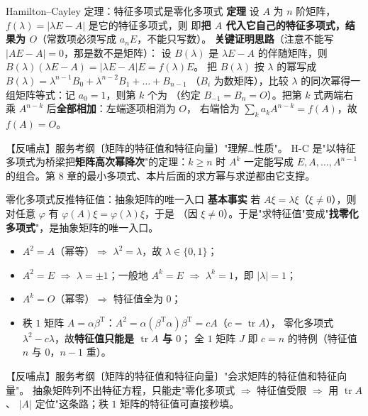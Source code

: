 \begin{fdeep}{Hamilton--Cayley 定理：特征多项式是零化多项式}
\textbf{定理} 设 $A$ 为 $n$ 阶矩阵，$f(\lambda)=\lvert\lambda E-A\rvert$ 是它的特征多项式，则
即\textbf{把 $A$ 代入它自己的特征多项式，结果为 $O$}（常数项必须写成 $a_nE$，不能只写数）。
\textbf{关键证明思路}（注意不能写 $\lvert AE-A\rvert=0$，那是数不是矩阵）：
设 $B(\lambda)$ 是 $\lambda E-A$ 的伴随矩阵，则 $B(\lambda)(\lambda E-A)=\lvert\lambda E-A\rvert E=f(\lambda)E$。
把 $B(\lambda)$ 按 $\lambda$ 的幂写成 $B(\lambda)=\lambda^{n-1}B_0+\lambda^{n-2}B_1+\dots+B_{n-1}$
（$B_i$ 为数矩阵），比较 $\lambda$ 的同次幂得一组矩阵等式：记 $a_0=1$，则第 $k$ 个为
（约定 $B_{-1}=B_n=O$）。把第 $k$ 式两端右乘 $A^{n-k}$ 后\textbf{全部相加}：左端逐项相消为 $O$，
右端恰为 $\sum_ka_kA^{n-k}=f(A)$，故 $f(A)=O$。

【反哺点】服务考纲〔矩阵的特征值和特征向量〕"理解…性质"。
H-C 是"以特征多项式为桥梁把\textbf{矩阵高次幂降次}"的定理：$k\ge n$ 时 $A^{k}$ 一定能写成
$E,A,\dots,A^{n-1}$ 的组合。第 8 章的最小多项式、本片后面的求方幂与求逆都由它支撑。
\end{fdeep}

\begin{fdeep}{零化多项式反推特征值：抽象矩阵的唯一入口}
\textbf{基本事实} 若 $A\xi=\lambda\xi$（$\xi\ne0$），则对任意 $\varphi$ 有
$\varphi(A)\xi=\varphi(\lambda)\xi$，于是
（因 $\xi\ne0$）。于是"求特征值"变成"\textbf{找零化多项式}"，是抽象矩阵的唯一入口。
\begin{itemize}[leftmargin=2.2em,itemsep=0.22em]
\item $A^{2}=A$（幂等）$\Rightarrow$ $\lambda^{2}=\lambda$，故 $\lambda\in\{0,1\}$；
\item $A^{2}=E$ $\Rightarrow$ $\lambda=\pm1$；一般地 $A^{k}=E$ $\Rightarrow$ $\lambda^{k}=1$，即 $|\lambda|=1$；
\item $A^{k}=O$（幂零）$\Rightarrow$ 特征值全为 $0$；
\item 秩 $1$ 矩阵 $A=\alpha\beta^{\mathrm T}$：$A^{2}=\alpha(\beta^{\mathrm T}\alpha)\beta^{\mathrm T}=cA$（$c=\operatorname{tr}A$），
零化多项式 $\lambda^{2}-c\lambda$，故\textbf{特征值只能是 $\operatorname{tr}A$ 与 $0$}；
全 $1$ 矩阵 $J$ 即 $c=n$ 的特例（特征值 $n$ 与 $0$，$n-1$ 重）。
\end{itemize}

【反哺点】服务考纲〔矩阵的特征值和特征向量〕"会求矩阵的特征值和特征向量"。
抽象矩阵列不出特征方程，只能走"零化多项式 $\Rightarrow$ 特征值受限 $\Rightarrow$ 用 $\operatorname{tr}A$、
$\lvert A\rvert$ 定位"这条路；秩 $1$ 矩阵的特征值可直接秒填。
\end{fdeep}

